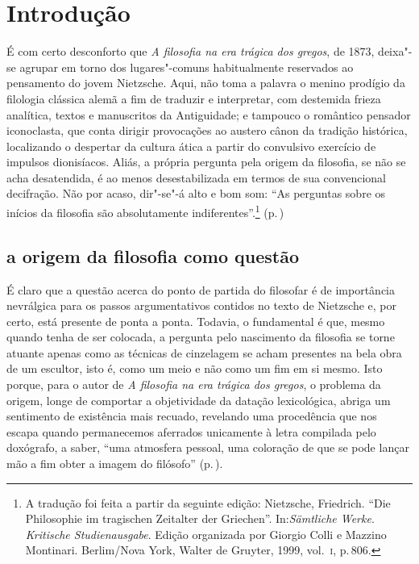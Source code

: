 
\chapter[Introdução, por Fernando R. de Moraes Barros]{Introdução}

É com certo desconforto que \textit{A filosofia na era trágica dos
 gregos}, de 1873, deixa"-se agrupar em torno dos lugares"-comuns
 habitualmente reservados ao pensamento do jovem Nietzsche. Aqui, não toma a
 palavra o menino prodígio da filologia clássica alemã a fim de traduzir e
 interpretar, com destemida frieza analítica, textos e manuscritos da
 Antiguidade; e tampouco o romântico pensador iconoclasta, que conta dirigir
 provocações ao austero cânon da tradição histórica, localizando o despertar
 da cultura ática a partir do convulsivo exercício de impulsos dionisíacos.
 Aliás, a própria pergunta pela origem da filosofia, se não se acha
 desatendida, é ao menos desestabilizada em termos de sua convencional
 decifração. Não por acaso, dir"-se"-á alto e bom som: ``As perguntas sobre
 os inícios da filosofia são absolutamente indiferentes''.\footnote {A
 tradução foi feita a partir da seguinte edição: Nietzsche, Friedrich. ``Die
 Philosophie im tragischen Zeitalter der Griechen''. In:\textit{Sämtliche Werke}. 
 \textit{Kritische Studienausgabe}. Edição organizada por Giorgio Colli e 
 Mazzino Montinari. Berlim/Nova York, Walter de Gruyter,
 1999, vol.~\textsc{i}, p.\,806.} (p.\,\pageref{perguntassobreosinicios}) 

\section{a origem da filosofia como questão} 

É claro que a questão acerca do ponto de partida do filosofar é de importância nevrálgica para os passos
 argumentativos contidos no texto de Nietzsche e, por certo, está presente de
 ponta a ponta. Todavia, o fundamental é que, mesmo quando tenha de ser
 colocada, a pergunta pelo nascimento da filosofia se torne atuante apenas
 como as técnicas de cinzelagem se acham presentes na bela obra de um
 escultor, isto é, como um meio e não como um fim em si mesmo. Isto porque,
 para o autor de
\textit{A filosofia na era trágica dos gregos}, o problema da origem, longe de
 comportar a objetividade da datação lexicológica, abriga um sentimento de
 existência mais recuado, revelando uma procedência que nos escapa quando
 permanecemos aferrados unicamente à letra compilada pelo doxógrafo, a saber,
 ``uma atmosfera pessoal, uma coloração de que se pode lançar mão a fim obter
 a imagem do filósofo'' (p.\,\pageref{atmosferapessoal}). 

